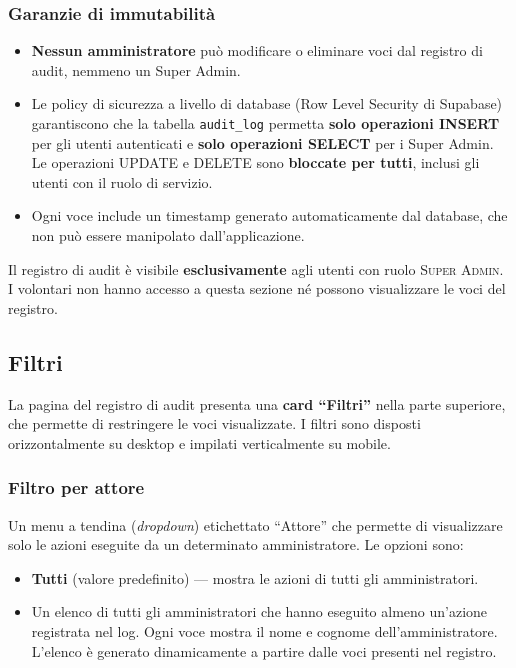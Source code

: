 \documentclass[a4paper,11pt,oneside]{book}
\newcommand{\ruolo}[1]{\textsc{#1}}
\begin{document}
\subsubsection{Garanzie di immutabilit\`a}

\begin{itemize}[leftmargin=1.5em]
  \item \textbf{Nessun amministratore} pu\`o modificare o eliminare voci dal registro di audit, nemmeno un Super Admin.
  \item Le policy di sicurezza a livello di database (Row Level Security di Supabase) garantiscono che la tabella \texttt{audit\_log} permetta \textbf{solo operazioni INSERT} per gli utenti autenticati e \textbf{solo operazioni SELECT} per i Super Admin. Le operazioni UPDATE e DELETE sono \textbf{bloccate per tutti}, inclusi gli utenti con il ruolo di servizio.
  \item Ogni voce include un timestamp generato automaticamente dal database, che non pu\`o essere manipolato dall'applicazione.
\end{itemize}

\begin{infobox}
Il registro di audit \`e visibile \textbf{esclusivamente} agli utenti con ruolo \ruolo{Super Admin}. I volontari non hanno accesso a questa sezione n\'e possono visualizzare le voci del registro.
\end{infobox}

\subsection{Filtri}
\label{sec:audit-filtri}

La pagina del registro di audit presenta una \textbf{card ``Filtri''} nella parte superiore, che permette di restringere le voci visualizzate. I filtri sono disposti orizzontalmente su desktop e impilati verticalmente su mobile.

\subsubsection{Filtro per attore}

Un menu a tendina (\textit{dropdown}) etichettato ``Attore'' che permette di visualizzare solo le azioni eseguite da un determinato amministratore. Le opzioni sono:

\begin{itemize}[leftmargin=1.5em]
  \item \textbf{Tutti} (valore predefinito) --- mostra le azioni di tutti gli amministratori.
  \item Un elenco di tutti gli amministratori che hanno eseguito almeno un'azione registrata nel log. Ogni voce mostra il nome e cognome dell'amministratore. L'elenco \`e generato dinamicamente a partire dalle voci presenti nel registro.
\end{itemize}
\end{document}
